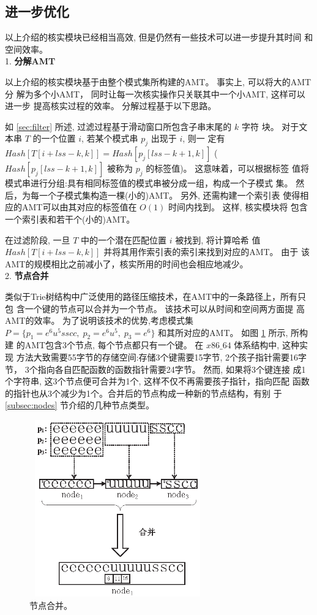 \subsection{进一步优化}
\label{sec:further improments}

以上介绍的核实模块已经相当高效, 但是仍然有一些技术可以进一步提升其时间
和空间效率。\\

1. \textbf{分解AMT}

以上介绍的核实模块基于由整个模式集所构建的AMT。 事实上, 可以将大的AMT分
解为多个小AMT， 同时让每一次核实操作只关联其中一个小AMT, 这样可以进一步
提高核实过程的效率。 分解过程基于以下思路。

如 \ref{sec:filter} 所述, 过滤过程基于滑动窗口所包含子串末尾的 $k$ 字符
块。 对于文本串 $T$ 的一个位置 $i$, 若某个模式串 $p_j$ 出现于 $i$, 则一
定有 $Hash[T[i+lss-k,k]] = Hash[p_j[lss-k+1,k]]$
($Hash[p_j[lss-k+1,k]]$ 被称为 $p_j$ 的标签值)。 这意味着，可以根据标签
值将模式串进行分组:具有相同标签值的模式串被分成一组，构成一个子模式
集。 然后，为每一个子模式集构造一棵(小的)AMT。 另外, 还需构建一个索引表
使得相应的AMT可以由其对应的标签值在 $O(1)$ 时间内找到。 这样, 核实模块将
包含一个索引表和若干个(小的)AMT。

在过滤阶段, 一旦 $T$ 中的一个潜在匹配位置 $i$ 被找到, 将计算哈希
值 $Hash[T[i+lss-k,k]]$ 并将其用作索引表的索引来找到对应的AMT。 由于
该AMT的规模相比之前减小了，核实所用的时间也会相应地减少。\\

2. \textbf{节点合并}

类似于Trie树结构中广泛使用的路径压缩技术，在AMT中的一条路径上，所有只包
含一个键的节点可以合并为一个节点。 该技术可以从时间和空间两方面提
高AMT的效率。
为了说明该技术的优势,考虑模式集$P=\{p_1=e^6u^5sscc,\; p_2=e^6u^5,\;
p_3=e^6\}$ 和其所对应的AMT。 如图 \ref{fig:merge} 所示, 所构建
的AMT包含3个节点, 每个节点都只有一个键。 在 $x86\_64$ 体系结构中, 这种实现
方法大致需要55字节的存储空间:存储3个键需要15字节, 2个孩子指针需要16字
节， 3个指向各自匹配函数的函数指针需要24字节。 然而, 如果将3个键连接
成1个字符串, 这3个节点便可合并为1个, 这样不仅不再需要孩子指针，指向匹配
函数的指针也从3个减少为1个。合并后的节点构成一种新的节点结构，有别
于 \ref{subsec:nodes} 节介绍的几种节点类型。

\begin{figure}[H]
  \centering
  \includegraphics[height=3in, width=3in]{figures/2_MPM/node_merge}
  \caption{节点合并。}
  \label{fig:merge}
\end{figure}

